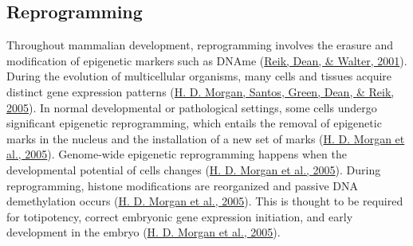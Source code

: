 \documentclass[12pt,twoside]{reedthesis}
\begin{document}
\hypertarget{reprogramming}{%
\subsection*{Reprogramming}\label{reprogramming}}

Throughout mammalian development, reprogramming involves the erasure and
modification of epigenetic markers such as DNAme (\protect\hyperlink{ref-reik2001}{Reik, Dean, \& Walter, 2001}). During the
evolution of multicellular organisms, many cells and tissues acquire
distinct gene expression patterns (\protect\hyperlink{ref-morgan2005}{H. D. Morgan, Santos, Green, Dean, \& Reik, 2005}). In normal developmental
or pathological settings, some cells undergo significant epigenetic
reprogramming, which entails the removal of epigenetic marks in the
nucleus and the installation of a new set of marks (\protect\hyperlink{ref-morgan2005}{H. D. Morgan et al., 2005}).
Genome-wide epigenetic reprogramming happens when the developmental
potential of cells changes (\protect\hyperlink{ref-morgan2005}{H. D. Morgan et al., 2005}). During reprogramming, histone
modifications are reorganized and passive DNA demethylation occurs
(\protect\hyperlink{ref-morgan2005}{H. D. Morgan et al., 2005}). This is thought to be required for totipotency, correct
embryonic gene expression initiation, and early development in the
embryo (\protect\hyperlink{ref-morgan2005}{H. D. Morgan et al., 2005}).
\end{document}
